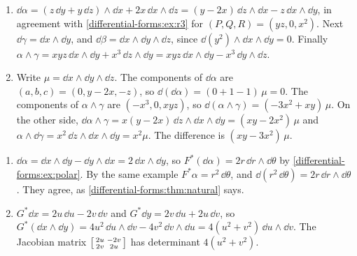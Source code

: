\begin{enumerate}[nosep]
  \item $\dd\alpha = (z\,\dd y + y\,\dd z)\wedge\dd x
        + 2x\,\dd x\wedge\dd z
        = (y - 2x)\,\dd z\wedge\dd x - z\,\dd x\wedge\dd y$, in
        agreement with \cref{differential-forms:ex:r3} for
        $(P, Q, R) = (yz, 0, x^2)$. Next
        $\dd\gamma = \dd x\wedge\dd y$, and
        $\dd\beta = \dd x\wedge\dd y\wedge\dd z$, since
        $\dd(y^2)\wedge\dd x\wedge\dd y = 0$. Finally
        $\alpha\wedge\gamma = xyz\,\dd x\wedge\dd y
        + x^3\,\dd z\wedge\dd y
        = xyz\,\dd x\wedge\dd y - x^3\,\dd y\wedge\dd z$.
  \item Write $\mu = \dd x\wedge\dd y\wedge\dd z$. The components of
        $\dd\alpha$ are $(a, b, c) = (0, y - 2x, -z)$, so
        $\dd(\dd\alpha) = (0 + 1 - 1)\,\mu = 0$. The components of
        $\alpha\wedge\gamma$ are $(-x^3, 0, xyz)$, so
        $\dd(\alpha\wedge\gamma) = (-3x^2 + xy)\,\mu$. On the other
        side, $\dd\alpha\wedge\gamma
        = x(y - 2x)\,\dd z\wedge\dd x\wedge\dd y = (xy - 2x^2)\,\mu$
        and $\alpha\wedge\dd\gamma = x^2\,\dd z\wedge\dd x\wedge\dd y
        = x^2\mu$. The difference is $(xy - 3x^2)\,\mu$.
\end{enumerate}

\begin{enumerate}[nosep]
  \item $\dd\alpha = \dd x\wedge\dd y - \dd y\wedge\dd x
        = 2\,\dd x\wedge\dd y$, so
        $F^*(\dd\alpha) = 2r\,\dd r\wedge\dd\theta$ by
        \cref{differential-forms:ex:polar}. By the same example
        $F^*\alpha = r^2\,\dd\theta$, and
        $\dd(r^2\,\dd\theta) = 2r\,\dd r\wedge\dd\theta$. They agree,
        as \cref{differential-forms:thm:natural} says.
  \item $G^*\dd x = 2u\,\dd u - 2v\,\dd v$ and
        $G^*\dd y = 2v\,\dd u + 2u\,\dd v$, so
        $G^*(\dd x\wedge\dd y) = 4u^2\,\dd u\wedge\dd v
        - 4v^2\,\dd v\wedge\dd u = 4(u^2 + v^2)\,\dd u\wedge\dd v$. The
        Jacobian matrix
        $\begin{bsmallmatrix}2u & -2v\\ 2v & 2u\end{bsmallmatrix}$ has
        determinant $4(u^2 + v^2)$.
\end{enumerate}

